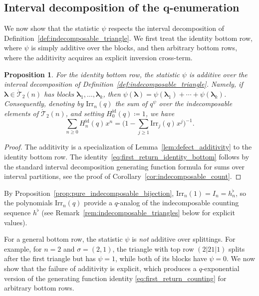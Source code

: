 \documentclass[10pt,a4paper]{amsart}
\numberwithin{equation}{section}
\newcommand{\ssp}{\hspace{1pt}}
\newtheorem{Proposition}[Theorem]{Proposition}
\theoremstyle{definition}
\begin{document}
\subsection[Interval decomposition of the q-enumeration]{Interval decomposition of the $\boldsymbol{q}$-enumeration}
\label{subsec:q_interval_decomposition}

We now show that the statistic $\psi$ respects the interval decomposition of
Definition~\ref{def:indecomposable_triangle}.
We first treat the identity bottom row, where $\psi$ is simply additive
over the blocks, and then arbitrary bottom rows, where the additivity
acquires an explicit inversion cross-term.

\begin{Proposition}
	\label{prop:psi_multiplicative}
	For the identity bottom row,
	the statistic $\psi$ is additive over the interval decomposition of
	Definition~{\rm \ref{def:indecomposable_triangle}}.
	Namely, if
	$\boldsymbol\lambda\in\mathring{\mathcal{T}}_2(n)$ has blocks
	$\boldsymbol\lambda_1,\dots,\boldsymbol\lambda_k$, then
	$\psi(\boldsymbol\lambda)
	=\psi(\boldsymbol\lambda_1)+\cdots+\psi(\boldsymbol\lambda_k)$.
	Consequently, denoting by $\mathrm{Irr}_n(q)$ the sum of $q^{\psi}$
	over the indecomposable elements of $\mathring{\mathcal{T}}_2(n)$, and
	setting $H_0^{\mathrm{id}}(q)\coloneqq1$, we have
	\begin{equation}
		\label{eq:first_return_identity_bottom}
		\sum_{n\ge0} H_n^{\mathrm{id}}(q)\ssp x^n =
		\biggl(1-\sum_{j\ge1} \mathrm{Irr}_j(q)\ssp x^j\biggr)^{-1}.
	\end{equation}
\end{Proposition}
\begin{proof}
The additivity is a specialization of Lemma~\ref{lem:defect_additivity} to the identity bottom row. The identity~\eqref{eq:first_return_identity_bottom} follows by the standard interval decomposition generating function formula for sums over interval partitions, see the proof of Corollary~\ref{cor:indecomposable_count}.
\end{proof}

By Proposition~\ref{prop:pure_indecomposable_bijection},
$\mathrm{Irr}_n(1)=I_n=h^\flat_n$, so the polynomials $\mathrm{Irr}_n(q)$
provide a $q$-analog of the indecomposable counting
sequence $h^\flat$ (see
Remark~\ref{rem:indecomposable_triangles} below for explicit values).

For a general bottom row, the statistic $\psi$ is \emph{not} additive
over splittings. For example, for $n=2$ and $\sigma=(2,1)$, the triangle with top row
$(2|21|1)$ splits after the first triangle but has $\psi=1$, while both
of its blocks have $\psi=0$.
We now show that the failure of additivity is explicit,
which produces a
$q$-exponential version of
the generating function identity \eqref{eq:first_return_counting} for arbitrary bottom rows.
\end{document}
